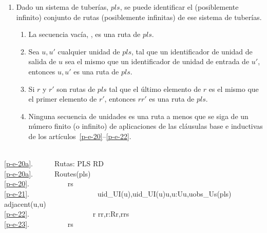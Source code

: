 \LLLL

\begin{enumerate}\setei
\item \label{p-e-20a}   Dado un sistema de tuberías, $pls$, se puede identificar el
                  (posiblemente infinito) conjunto de rutas (posiblemente infinitas)
                  de ese sistema de tuberías.
\begin{enumerate}
\item \label{p-e-20}  La secuencia vacía, {\LANGLE}{\RANGLE}, es una
                      ruta de $pls$.  
\item \label{p-e-21}  Sea $u, u'$ cualquier unidad de $pls$, tal que
                      un identificador de unidad de salida de $u$ sea el mismo que
                      un identificador de unidad de entrada de $u'$, entonces
                      {\LANGLE}$u,u'${\RANGLE} es una ruta de $pls$.
\item \label{p-e-22}  Si $r$ y $r'$ son rutas de $pls$ tal que
                      el último elemento de $r$ es el mismo que el primer
                      elemento de $r'$, entonces $r${\CONCAT}$r'$ es
                      una ruta de $pls$.  
\item \label{p-e-23}  Ninguna secuencia de unidades es una ruta a menos que
                      se siga de un número finito (o infinito) de
                      aplicaciones de las cláusulas base e inductivas
                      de los artículos~\ref{p-e-20}--\ref{p-e-22}.
\end{enumerate}
\savei\end{enumerate}

\mnewfoil\LLLL\HHHH

\bp
\>\ \\
\ref{p-e-20a}.\ \ \ \ \ \ Rutas: PLS {\RIGHTARROW} RD\\
\ref{p-e-20a}.\ \ \ \ \ \ Routes(pls) {\IS} \\
\ref{p-e-20}.\ \ \ \ \ \ \ \ \ \  rs {\EQ} {\LANGLE}{\RANGLE} {\UNION} \\
\ref{p-e-21}.\ \ \ \ \ \ \ \ \ \ \ \ \ \ \ \ \ \ \ {\LBRACE}{\LANGLE}uid\_UI(u),uid\_UI(u{\PRIM}){\RANGLE}{\BAR}u,u{\PRIM}:U{\RDOT}{\LBRACE}u,u{\PRIM}{\RBRACE}{\SUBSETEQ}obs\_Us(pls) {\WEDGE} adjacent(u,u{\PRIM}){\RBRACE}\\
\ref{p-e-22}.\ \ \ \ \ \ \ \ \ \ \ \ \ \ \ \ \ {\UNION} {\LBRACE}r{\CONCAT} r{\PRIM}{\BAR}r,r{\PRIM}:R{\RDOT}{\LBRACE}r,r{\PRIM}{\RBRACE}{\SUBSETEQ}rs{\RBRACE}\\
\ref{p-e-23}.\ \ \ \ \ \ \ \ \ \  rs 
\ep

